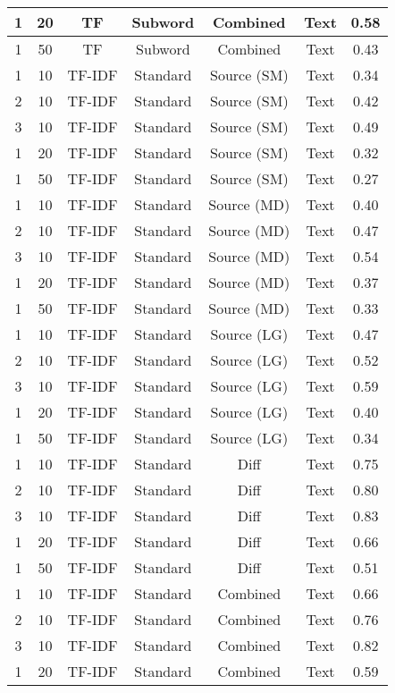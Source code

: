 \begin{longtable}{|c|c|c|c|c|c|c|}
\hline
1 & 20 & TF & Subword & Combined & Text & 0.58 \\
\hline
1 & 50 & TF & Subword & Combined & Text & 0.43 \\
\hline
1 & 10 & TF-IDF & Standard & Source (SM) & Text & 0.34 \\
\hline
2 & 10 & TF-IDF & Standard & Source (SM) & Text & 0.42 \\
\hline
3 & 10 & TF-IDF & Standard & Source (SM) & Text & 0.49 \\
\hline
1 & 20 & TF-IDF & Standard & Source (SM) & Text & 0.32 \\
\hline
1 & 50 & TF-IDF & Standard & Source (SM) & Text & 0.27 \\
\hline
1 & 10 & TF-IDF & Standard & Source (MD) & Text & 0.40 \\
\hline
2 & 10 & TF-IDF & Standard & Source (MD) & Text & 0.47 \\
\hline
3 & 10 & TF-IDF & Standard & Source (MD) & Text & 0.54 \\
\hline
1 & 20 & TF-IDF & Standard & Source (MD) & Text & 0.37 \\
\hline
1 & 50 & TF-IDF & Standard & Source (MD) & Text & 0.33 \\
\hline
1 & 10 & TF-IDF & Standard & Source (LG) & Text & 0.47 \\
\hline
2 & 10 & TF-IDF & Standard & Source (LG) & Text & 0.52 \\
\hline
3 & 10 & TF-IDF & Standard & Source (LG) & Text & 0.59 \\
\hline
1 & 20 & TF-IDF & Standard & Source (LG) & Text & 0.40 \\
\hline
1 & 50 & TF-IDF & Standard & Source (LG) & Text & 0.34 \\
\hline
1 & 10 & TF-IDF & Standard & Diff & Text & 0.75 \\
\hline
2 & 10 & TF-IDF & Standard & Diff & Text & 0.80 \\
\hline
3 & 10 & TF-IDF & Standard & Diff & Text & 0.83 \\
\hline
1 & 20 & TF-IDF & Standard & Diff & Text & 0.66 \\
\hline
1 & 50 & TF-IDF & Standard & Diff & Text & 0.51 \\
\hline
1 & 10 & TF-IDF & Standard & Combined & Text & 0.66 \\
\hline
2 & 10 & TF-IDF & Standard & Combined & Text & 0.76 \\
\hline
3 & 10 & TF-IDF & Standard & Combined & Text & 0.82 \\
\hline
1 & 20 & TF-IDF & Standard & Combined & Text & 0.59 \\

\end{longtable}
